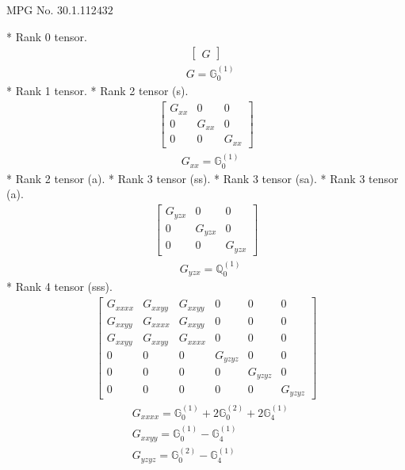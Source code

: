 \documentclass[fleqn,8pt,landscape]{jsarticle}
\begin{document}
\setcounter{MaxMatrixCols}{32}

\renewcommand{\tablename}{Table~}
\renewcommand{\figurename}{Figure~}
\begin{center}
\LARGE
MPG No. 30.1.112\quad$432$
\end{center}
* Rank 0 tensor.
\begin{align*}
\begin{bmatrix} G \end{bmatrix}
\end{align*}
\begin{align*}
& G = \mathbb{G}_{0}^{(1)}
\end{align*}
* Rank 1 tensor.
* Rank 2 tensor (s).
\begin{align*}
\begin{bmatrix} G_{xx} & 0 & 0 \\ 0 & G_{xx} & 0 \\ 0 & 0 & G_{xx} \end{bmatrix}
\end{align*}
\begin{align*}
& G_{xx} = \mathbb{G}_{0}^{(1)}
\end{align*}
* Rank 2 tensor (a).
* Rank 3 tensor (ss).
* Rank 3 tensor (sa).
* Rank 3 tensor (a).
\begin{align*}
\begin{bmatrix} G_{yzx} & 0 & 0 \\ 0 & G_{yzx} & 0 \\ 0 & 0 & G_{yzx} \end{bmatrix}
\end{align*}
\begin{align*}
& G_{yzx} = \mathbb{Q}_{0}^{(1)}
\end{align*}
* Rank 4 tensor (sss).
\begin{align*}
\begin{bmatrix} G_{xxxx} & G_{xxyy} & G_{xxyy} & 0 & 0 & 0 \\ G_{xxyy} & G_{xxxx} & G_{xxyy} & 0 & 0 & 0 \\ G_{xxyy} & G_{xxyy} & G_{xxxx} & 0 & 0 & 0 \\ 0 & 0 & 0 & G_{yzyz} & 0 & 0 \\ 0 & 0 & 0 & 0 & G_{yzyz} & 0 \\ 0 & 0 & 0 & 0 & 0 & G_{yzyz} \end{bmatrix}
\end{align*}
\begin{align*}
& G_{xxxx} = \mathbb{G}_{0}^{(1)} + 2 \mathbb{G}_{0}^{(2)} + 2 \mathbb{G}_{4}^{(1)} \\
& G_{xxyy} = \mathbb{G}_{0}^{(1)} - \mathbb{G}_{4}^{(1)} \\
& G_{yzyz} = \mathbb{G}_{0}^{(2)} - \mathbb{G}_{4}^{(1)}
\end{align*}
\end{document}
